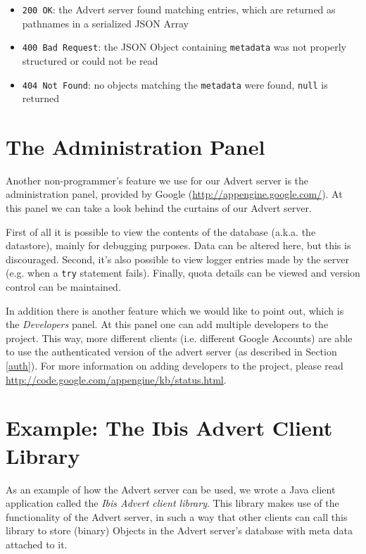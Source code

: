 \documentclass[a4paper,10pt]{article}
\begin{document}
\begin{itemize}
  \item \texttt{200 OK}: the Advert server found matching entries, which are
  returned as pathnames in a serialized JSON Array
  \item \texttt{400 Bad Request}: the JSON Object containing \texttt{metadata}
  was not properly structured or could not be read
  \item \texttt{404 Not Found}: no objects matching the \texttt{metadata} were
  found, \texttt{null} is returned
\end{itemize}

\section{The Administration Panel}
\label{admin-panel}
Another non-programmer's feature we use for our Advert server is the
administration panel, provided by Google (\url{http://appengine.google.com/}).
At this panel we can take a look behind the curtains of our Advert server.

First of all it is possible to view the contents of the database (a.k.a. the
datastore), mainly for debugging purposes. Data can be altered here, but this
is discouraged. Second, it's also possible to view logger entries made by the
server (e.g. when a \texttt{try} statement fails). Finally, quota details can
be viewed and version control can be maintained.

In addition there is another feature which we would like to point out, which is
the \emph{Developers} panel. At this panel one can add multiple developers to
the project. This way, more different clients (i.e. different Google Accounts)
are able to use the authenticated version of the advert server (as described in
Section \ref{auth}). For more information on adding developers to the project,
please read \url{http://code.google.com/appengine/kb/status.html}.

\section{Example: The Ibis Advert Client Library}
\label{advert-lib}
As an example of how the Advert server can be used, we wrote a Java client
application called the \emph{Ibis Advert client library}. This library makes use
of the functionality of the Advert server, in such a way that other clients can
call this library to store (binary) Objects in the Advert server's database
with meta data attached to it.
\end{document}
